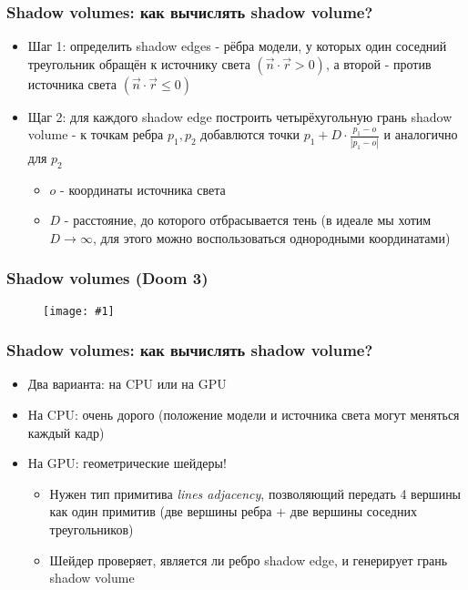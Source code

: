 \documentclass{beamer}
\newcommand{\slideimage}[1]{
  \begin{figure}
    \begin{adjustbox}{width=\textwidth, totalheight=\textheight-2\baselineskip-2\baselineskip,keepaspectratio}
      \texttt{[image: \#1]}
    \end{adjustbox}
  \end{figure}
}
\begin{document}
\begin{frame}[fragile]
\frametitle{Shadow volumes: как вычислять shadow volume?}
\begin{itemize}
\item Шаг 1: определить shadow edges - рёбра модели, у которых один соседний треугольник обращён к источнику света \begin{math}\left(\vec n \cdot \vec r > 0\right)\end{math}, а второй - против источника света \begin{math}\left(\vec n \cdot \vec r \leq 0\right)\end{math}
\pause
\item Щаг 2: для каждого shadow edge построить четырёхугольную грань shadow volume - к точкам ребра \begin{math}p_1, p_2\end{math} добавлются точки \begin{math}p_1 + D \cdot \frac{p_1 - o}{|p_1 - o|}\end{math} и аналогично для \begin{math}p_2\end{math}
\begin{itemize}
\item \begin{math}o\end{math} - координаты источника света
\item \begin{math}D\end{math} - расстояние, до которого отбрасывается тень (в идеале мы хотим \begin{math}D\rightarrow\infty\end{math}, для этого можно воспользоваться однородными координатами)
\end{itemize}
\end{itemize}
\end{frame}

\begin{frame}[fragile]
\frametitle{Shadow volumes (Doom 3)}
\slideimage{shadow-edge.jpg}
\end{frame}

\begin{frame}[fragile]
\frametitle{Shadow volumes: как вычислять shadow volume?}
\begin{itemize}
\item Два варианта: на CPU или на GPU
\pause
\item На CPU: очень дорого (положение модели и источника света могут меняться каждый кадр)
\pause
\item На GPU: геометрические шейдеры!
\begin{itemize}
\item Нужен тип примитива \textit{lines adjacency}, позволяющий передать 4 вершины как один примитив (две вершины ребра + две вершины соседних треугольников)
\pause
\item Шейдер проверяет, является ли ребро shadow edge, и генерирует грань shadow volume
\end{itemize}
\end{itemize}
\end{frame}
\end{document}
